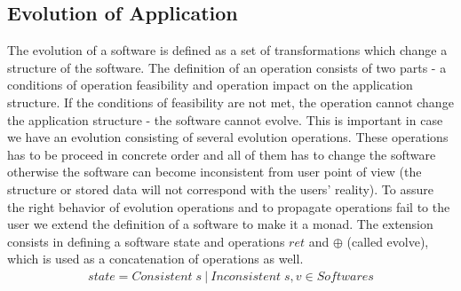 \documentclass[11pt]{article}
\begin{document}
\subsection{Evolution of Application}
\label{sec:appEvolution}

The evolution of a software is defined as a set of transformations which change a structure of the software. The definition of an operation consists of two parts - a conditions of operation feasibility and operation impact on the application structure. If the conditions of feasibility are not met, the operation cannot change the application structure - the software cannot evolve. This is important in case we have an evolution consisting of several evolution operations. These operations has to be proceed in concrete order and all of them has to change the software otherwise the software can become inconsistent from user point of view (the structure or stored data will not correspond with the users' reality). To assure the right behavior of evolution operations and to propagate operations fail to the user we extend the definition of a software to make it a monad. The extension consists in defining a software state and operations $ret$ and $\oplus$ (called evolve), which is used as a concatenation of operations as well.
\begin{gather*}
state = Consistent \; s \: | \: Inconsistent \; s, v \in Softwares 
\end{gather*}
\end{document}
